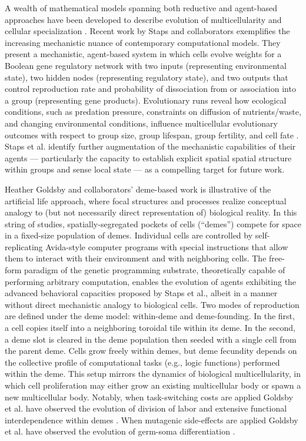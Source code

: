 A wealth of mathematical models spanning both reductive and agent-based approaches have been developed to describe evolution of multicellularity and cellular specialization \cite{hanschen2015evolutionary}.
Recent work by Staps and collaborators exemplifies the increasing mechanistic nuance of contemporary computational models.
They present a mechanistic, agent-based system in which cells evolve weights for a Boolean gene regulatory network with two inputs (representing environmental state), two hidden nodes (representing regulatory state), and two outputs that control reproduction rate and probability of dissociation from or association into a group (representing gene products).
Evolutionary runs reveal how ecological conditions, such as predation pressure, constraints on diffusion of nutrients/waste, and changing environmental conditions, influence multicellular evolutionary outcomes with respect to group size, group lifespan, group fertility, and cell fate \citep{staps2019emergence}.
Staps et al. identify further augmentation of the mechanistic capabilities of their agents --- particularly the capacity to establish explicit spatial spatial structure within groups and sense local state --- as a compelling target for future work.

Heather Goldsby and collaborators' deme-based work is illustrative of the artificial life approach, where focal structures and processes realize conceptual analogy to (but not necessarily direct representation of) biological reality.
In this string of studies, spatially-segregated pockets of cells (``demes'') compete for space in a fixed-size population of demes.
Individual cells are controlled by self-replicating Avida-style computer programs with special instructions that allow them to interact with their environment and with neighboring cells.
The free-form paradigm of the genetic programming substrate, theoretically capable of performing arbitrary computation, enables the evolution of agents exhibiting the advanced behavioral capacities proposed by Staps et al., albeit in a manner without direct mechanistic analogy to biological cells.
Two modes of reproduction are defined under the deme model: within-deme and deme-founding.
In the first, a cell copies itself into a neighboring toroidal tile within its deme.
In the second, a deme slot is cleared in the deme population then seeded with a single cell from the parent deme.
Cells grow freely within demes, but deme fecundity depends on the collective profile of computational tasks (e.g., logic functions) performed within the deme.
This setup mirrors the dynamics of biological multicellularity, in which cell proliferation may either grow an existing multicellular body or spawn a new multicellular body.
Notably, when task-switching costs are applied Goldsby et al. have observed the evolution of division of labor and extensive functional interdependence within demes \citep{goldsby2012task}.
When mutagenic side-effects are applied Goldsby et al. have observed the evolution of germ-soma differentiation \citep{goldsby2014evolutionary}.

